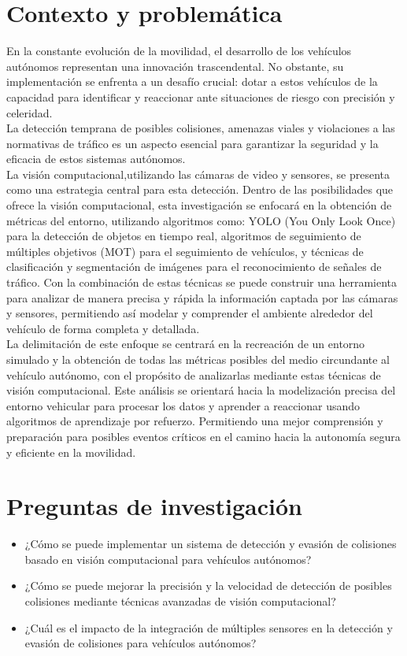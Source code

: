 \documentclass[12pt,letterpaper,final]{article}
\begin{document}
    \section*{Contexto y problemática}
    \noindent En la constante evolución de la movilidad, el desarrollo de los vehículos autónomos representan una innovación trascendental.
    No obstante, su implementación se enfrenta a un desafío crucial: dotar a estos vehículos de la capacidad para identificar
    y reaccionar ante situaciones de riesgo con precisión y celeridad. \\
    La detección temprana de posibles colisiones, amenazas viales y violaciones a las normativas de tráfico
    es un aspecto esencial para garantizar la seguridad y la eficacia de estos sistemas autónomos.\\
    La visión computacional,utilizando las cámaras de video y sensores, se presenta como una estrategia central para esta detección.
    Dentro de las posibilidades que ofrece la visión computacional, esta investigación se enfocará en la obtención de métricas del entorno,
    utilizando algoritmos como:
    YOLO (You Only Look Once) para la detección de objetos en tiempo real,
    algoritmos de seguimiento de múltiples objetivos (MOT) para el seguimiento de vehículos, y
    técnicas de clasificación y segmentación de imágenes para el reconocimiento de señales de tráfico.
    Con la combinación de estas técnicas se puede construir una herramienta para analizar de manera precisa y rápida
    la información captada por las cámaras y sensores, permitiendo así modelar y comprender el ambiente alrededor del vehículo de forma completa y detallada.\\
    La delimitación de este enfoque se centrará en la recreación de un entorno simulado y la obtención de todas las métricas posibles
    del medio circundante al vehículo autónomo, con el propósito de analizarlas mediante estas técnicas de visión computacional.
    Este análisis se orientará hacia la modelización precisa del entorno vehicular para procesar los datos y aprender a reaccionar
    usando algoritmos de aprendizaje por refuerzo. Permitiendo una mejor comprensión y preparación para posibles
    eventos críticos en el camino hacia la autonomía segura y eficiente en la movilidad.
    \clearpage
    
    \section*{Preguntas de investigación}
    \begin{itemize}
        \item ¿Cómo se puede implementar un sistema de detección y evasión de colisiones basado en visión computacional para vehículos autónomos?
        \item ¿Cómo se puede mejorar la precisión y la velocidad de detección de posibles colisiones mediante técnicas avanzadas de visión computacional?
        \item ¿Cuál es el impacto de la integración de múltiples sensores en la detección y evasión de colisiones para vehículos autónomos?
    \end{itemize}
    
\end{document}
